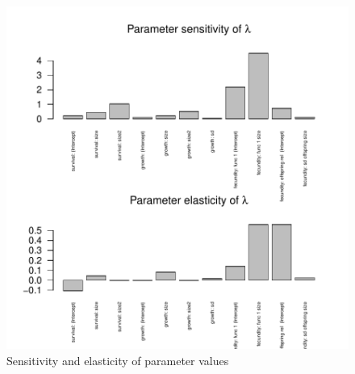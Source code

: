 \documentclass{article}
\begin{document}
\begin{figure}
\begin{center}
\includegraphics{IPMpack_vignette-fig4a}
\end{center}
\caption{Sensitivity and elasticity of parameter values}
\label{fig:foura}
\end{figure}
\end{document}

